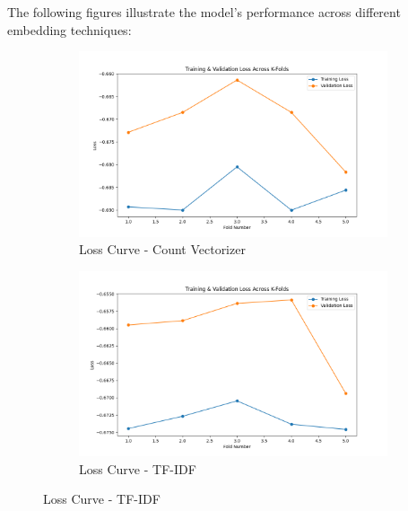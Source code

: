The following figures illustrate the model’s performance across different embedding techniques:
\begin{figure}[H]
    \centering
    \begin{subfigure}[b]{0.48\textwidth}
        \includegraphics[width=\textwidth]{img/report_info/img/1.4.RF/best_random_forest_count_loss.png}
        \caption{Loss Curve - Count Vectorizer}
        \label{fig:rf-count-loss}
    \end{subfigure}
    \begin{subfigure}[b]{0.48\textwidth}
        \includegraphics[width=\textwidth]{img/report_info/img/1.4.RF/best_random_forest_tfidf_loss.png}
        \caption{Loss Curve - TF-IDF}
        \label{fig:rf-tfidf-loss}
    \end{subfigure}
    

\end{figure}
